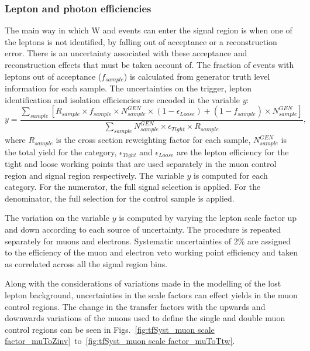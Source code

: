 \subsubsection*{Lepton and photon efficiencies}
\label{sec:tfSyst_lepton}
The main way in which W and \ttbar events can enter the signal region
is when one of the leptons is not identified, by falling out of
acceptance or a reconstruction error. There is an uncertainty
associated with these acceptance and reconstruction effects that must
be taken account of.
The fraction of events with leptons out of acceptance ($f_{sample}$)
is calculated from generator truth level information for each \MC
sample. The uncertainties on the trigger, lepton identification and
isolation efficiencies are encoded in the variable $y$:
\begin{equation}
    \label{eq:lostLepTF}
    y = \frac{\sum_{sample} [ R_{sample} \times f_{sample} \times
    N^{GEN}_{sample} \times ( 1 - \epsilon_{Loose} ) + ( 1 -
    f_{sample} ) \times N^{GEN}_{sample} ]}{ \sum_{sample}
    N^{GEN}_{sample} \times \epsilon_{Tight} \times R_{sample} },
\end{equation}
where $R_{sample}$ is the cross section reweighting factor for each
sample, $N^{GEN}_{sample}$ is the total \MC yield for the category,
$\epsilon_{Tight}$ and $\epsilon_{Loose}$ are the lepton efficiency
for the tight and loose working points that are used separately in the
muon control region and signal region respectively. The variable $y$ is computed for
each category. For the numerator, the full signal selection is
applied.  For the denominator, the full selection for the \mj control
sample is applied.

The variation on the variable $y$ is computed by varying the lepton
scale factor up and down according to each source of uncertainty.
The procedure is repeated separately for muons and
electrons.  Systematic uncertainties of 2\% are assigned to the
efficiency of the muon and electron veto working point efficiency and
taken as correlated across all the signal region bins. 

Along with the considerations of variations made in the modelling of
the lost lepton background, uncertainties in the scale factors can
effect yields in the muon control regions. The change in the transfer
factors with the upwards and downwards variations of the muons used to
define the single and double muon control regions can be seen in
Figs.~\ref{fig:tfSyst_muon scale
factor_muToZinv}~to~\ref{fig:tfSyst_muon scale factor_muToTtw}.

